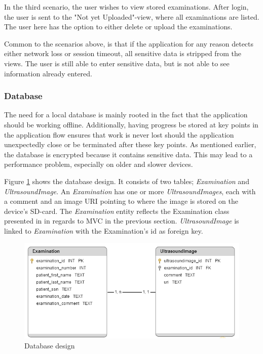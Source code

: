 In the third scenario, the user wishes to view stored examinations. After login, the user is sent to the "Not yet Uploaded"-view, where all examinations are listed. The user here has the option to either delete or upload the examinations. 

Common to the scenarios above, is that if the application for any reason detects either network loss or session timeout, all sensitive data is stripped from the views. The user is still able to enter sensitive data, but is not able to see information already entered.


\subsubsection{Database}
\label{databaseImp}

The need for a local database is mainly rooted in the fact that the application should be working offline. Additionally, having progress be stored at key points in the application flow ensures that work is never lost should the application unexpectedly close or be terminated after these key points. As mentioned earlier, the database is encrypted because it contains sensitive data. This may lead to a performance problem, especially on older and slower devices.

Figure \ref{fig:database_design} shows the database design. It consists of two tables; \emph{Examination} and \emph{UltrasoundImage}. An \emph{Examination} has one or more \emph{UltrasoundImages}, each with a comment and an image URI pointing to where the image is stored on the device's SD-card. The \emph{Examination} entity reflects the Examination class presented in in regards to MVC in the previous section. \emph{UltrasoundImage} is linked to \emph{Examination} with the Examination's id as foreign key.

\begin{figure}[H]
\centerline{\includegraphics[scale=0.9]{img/database_design.png}}
\caption{Database design}
\label{fig:database_design}
\end{figure}

